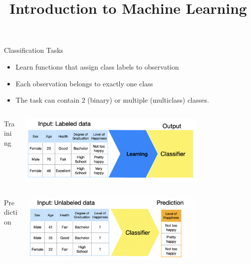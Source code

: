 \documentclass[11pt,compress,t,notes=noshow, xcolor=table]{beamer}
\title{Introduction to Machine Learning}
\date{}
\begin{document}
\sloppy

\begin{vbframe}{Classification Tasks}
\begin{itemize}
\item \small Learn functions that assign class labels to observation
\item \small Each observation belongs to exactly one class
\item \small The task can contain 2 (binary) or multiple (multiclass) classes.
\end{itemize}


\begin{columns}  
\begin{column}{0.1\textwidth} 
\begin{center}
Training
\end{center}
\end{column}
\begin{column}{0.9\textwidth} 
\begin{center}
  \includegraphics[width = 0.75\textwidth]{slides/supervised-classification/figure_man/nutshell-classification-training-task.png}
\end{center}
\end{column}
\end{columns}
\begin{columns}
\begin{column}{0.1\textwidth} 
\begin{center}
Prediction
\end{center}
\end{column}
\begin{column}{0.9\textwidth} 
\begin{center}
  \includegraphics[width = 0.75\textwidth]{slides/supervised-classification/figure_man/nutshell-classification-prediction-task.png} 
\end{center}
\end{column}
\end{columns}
\end{vbframe}
\end{document}
